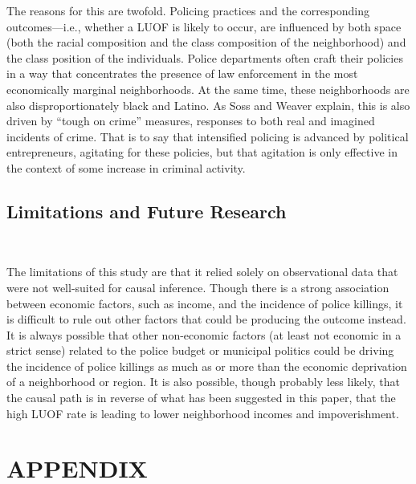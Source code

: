 \documentclass[12pt]{article}
\begin{document}
The reasons for this are twofold. Policing practices and the corresponding outcomes—i.e., whether a LUOF is likely to occur, are influenced by both space (both the racial composition and the class composition of the neighborhood) and the class position of the individuals. Police departments often craft their policies in a way that concentrates the presence of law enforcement in the most economically marginal neighborhoods. At the same time, these neighborhoods are also disproportionately black and Latino. As Soss and Weaver explain, this is also driven by “tough on crime” measures, responses to both real and imagined incidents of crime. That is to say that intensified policing is advanced by political entrepreneurs, agitating for these policies, but that agitation is only effective in the context of some increase in criminal activity.

\subsection{Limitations and Future Research} \

The limitations of this study are that it relied solely on observational data that were not well-suited for causal inference. Though there is a strong association between economic factors, such as income, and the incidence of police killings, it is difficult to rule out other factors that could be producing the outcome instead. It is always possible that other non-economic factors (at least not economic in a strict sense) related to the police budget or municipal politics could be driving the incidence of police killings as much as or more than the economic deprivation of a neighborhood or region. It is also possible, though probably less likely, that the causal path is in reverse of what has been suggested in this paper, that the high LUOF rate is leading to lower neighborhood incomes and impoverishment.
\section{APPENDIX}
\end{document}
